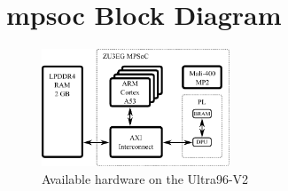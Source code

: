 \section{\acrshort{mpsoc} Block Diagram}
\label{sec:embedded_platform:block_diagram}

\begin{figure}[h]
	\centering
	\includegraphics[width=0.5\textwidth]{graphics/hardware_overview.pdf}
	\caption{Available hardware on the Ultra96-V2}
	\label{fig:hardware_overview}
\end{figure}
